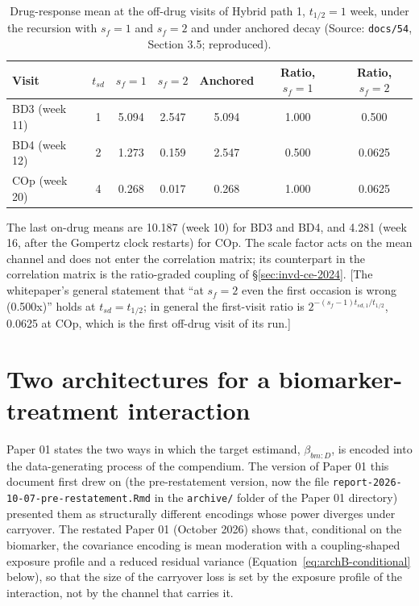 \documentclass[11pt]{article}
\newcommand{\note}[1]{\textcolor{blue!60!black}{\small [#1]}}
\newcommand{\code}[1]{\texttt{#1}}
\begin{document}
\begin{table}[h]
\centering\small
\caption{Drug-response mean at the off-drug visits of Hybrid path 1,
$t_{1/2} = 1$ week, under the recursion with $s_f = 1$ and $s_f = 2$
and under anchored decay (Source:
\code{docs/54}, Section 3.5; reproduced).}
\label{tab:invd-scalefactor}
\begin{tabular}{@{}lcccccc@{}}
\toprule
Visit & $t_{sd}$ & $s_f = 1$ & $s_f = 2$ & Anchored &
  Ratio, $s_f = 1$ & Ratio, $s_f = 2$ \\
\midrule
BD3 (week 11) & 1 & 5.094 & 2.547 & 5.094 & 1.000 & 0.500 \\
BD4 (week 12) & 2 & 1.273 & 0.159 & 2.547 & 0.500 & 0.0625 \\
COp (week 20) & 4 & 0.268 & 0.017 & 0.268 & 1.000 & 0.0625 \\
\bottomrule
\end{tabular}
\end{table}

\noindent The last on-drug means are 10.187 (week 10) for BD3 and BD4,
and 4.281 (week 16, after the Gompertz clock restarts) for COp. The
scale factor acts on the mean channel and does not enter the
correlation matrix; its counterpart in the correlation matrix is the
ratio-graded coupling of \S\ref{sec:invd-ce-2024}. \note{The
whitepaper's general statement that ``at $s_f = 2$ even the first
occasion is wrong (0.500x)'' holds at $t_{sd} = t_{1/2}$; in general
the first-visit ratio is $2^{-(s_f - 1)t_{sd,1}/t_{1/2}}$, 0.0625 at
COp, which is the first off-drug visit of its run.}

\section{Two architectures for a biomarker-treatment interaction}
\label{sec:architectures}

Paper 01 states the two ways in which the target estimand,
$\beta_{bm:D}$, is encoded into the data-generating process of the
compendium. The version of Paper 01 this document first drew on (the
pre-restatement version, now the file
\code{report-2026-10-07-pre-restatement.Rmd} in the \code{archive/}
folder of the Paper 01 directory) presented
them as structurally different encodings whose power diverges under
carryover. The restated Paper 01 (October 2026) shows that, conditional
on the biomarker, the covariance encoding is mean moderation with a
coupling-shaped exposure profile and a reduced residual variance
(Equation~\eqref{eq:archB-conditional} below), so that the size of the
carryover loss is set by the exposure profile of the interaction, not
by the channel that carries it.
\end{document}
